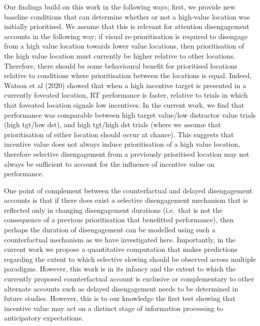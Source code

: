\documentclass[11pt,halfline,a4paper,]{ouparticle}
\begin{document}
Our findings build on this work in the following ways; first, we provide new baseline conditions that can determine whether or not a high-value location was initially prioritised. We assume that this is relevant for attention disengagement accounts in the following way; if visual re-prioritisation is required to disengage from a high value location towards lower value locations, then prioritisation of the high value location must currently be higher relative to other locations. Therefore, there should be some behavioural benefit for prioritised locations relative to conditions where prioritisation between the locations is equal. Indeed, Watson et al (2020) showed that when a high incentive target is presented in a currently foveated location, RT performance is faster, relative to trials in which that foveated location signals low incentives. In the current work, we find that performance was comparable between high target value/low distractor value trials (high tgt/low dst), and high tgt/high dst trials (where we assume that prioritisation of either location should occur at chance). This suggests that incentive value does not always induce prioritisation of a high value location, therefore selective disengagement from a previously prioritised location may not always be sufficient to account for the influence of incentive value on performance.

One point of complement between the counterfactual and delayed disengagement accounts is that if there does exist a selective disengagement mechanism that is reflected only in changing disengagement durations (i.e.~that is not the consequence of a previous prioritisation that benefitted performance), then perhaps the duration of disengagement can be modelled using such a counterfactual mechanism as we have investigated here. Importantly, in the current work we propose a quantitative computation that makes predictions regarding the extent to which selective slowing should be observed across multiple paradigms. However, this work is in its infancy and the extent to which the currently proposed counterfactual account is exclusive or complementary to other alternate accounts such as delayed disengagement needs to be determined in future studies. However, this is to our knowledge the first test showing that incentive value may act on a distinct stage of information processing to anticipatory expectations.
\end{document}
